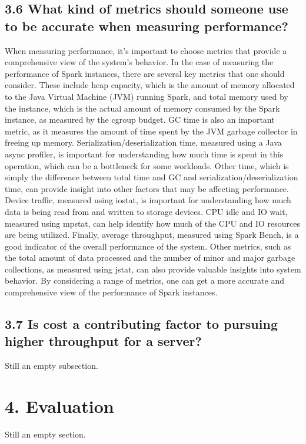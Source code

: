 \documentclass[twocolumn,10pt]{asme2e}
\begin{document}
\subsection*{3.6 What kind of metrics should someone use to be accurate when measuring performance?}
When measuring performance, it's important to choose metrics that provide a comprehensive view of the system's behavior. In the case of measuring the performance of Spark instances, there are several key metrics that one should consider. These include heap capacity, which is the amount of memory allocated to the Java Virtual Machine (JVM) running Spark, and total memory used by the instance, which is the actual amount of memory consumed by the Spark instance, as measured by the cgroup budget. GC time is also an important metric, as it measures the amount of time spent by the JVM garbage collector in freeing up memory. Serialization/deserialization time, measured using a Java async profiler, is important for understanding how much time is spent in this operation, which can be a bottleneck for some workloads. Other time, which is simply the difference between total time and GC and serialization/deserialization time, can provide insight into other factors that may be affecting performance. Device traffic, measured using iostat, is important for understanding how much data is being read from and written to storage devices. CPU idle and IO wait, measured using mpstat, can help identify how much of the CPU and IO resources are being utilized. Finally, average throughput, measured using Spark Bench, is a good indicator of the overall performance of the system. Other metrics, such as the total amount of data processed and the number of minor and major garbage collections, as measured using jstat, can also provide valuable insights into system behavior. By considering a range of metrics, one can get a more accurate and comprehensive view of the performance of Spark instances.

\subsection*{3.7 Is cost a contributing factor to pursuing higher throughput for a server?}
Still an empty subsection.

\section*{4. Evaluation}
Still an empty section.
\end{document}
